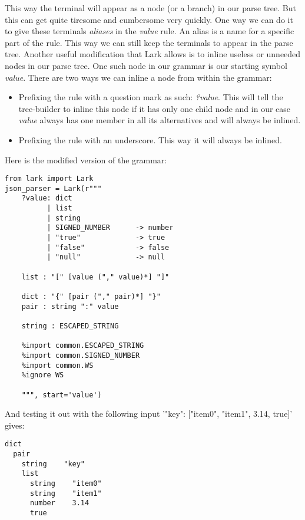 \documentclass[12pt]{article}
\begin{document}
This way the terminal will appear as a node (or a branch)  in our parse tree. But this can get quite tiresome and cumbersome very quickly. One way we can do it to give these terminals \emph{aliases} in the \emph{value} rule. An alias is a name for a specific part of the rule. This way we can still keep the terminals to appear in the parse tree. 
Another useful modification that Lark allows is to inline useless or unneeded nodes in our parse tree. One such node in our grammar is our starting symbol \emph{value}. There are two ways we can inline a node from within the grammar:
\begin{itemize}
    \item Prefixing the rule with a question mark as such: \emph{?value}. This will tell the tree-builder to inline this node if it has only one child node and in our case \emph{value} always has one member in all its alternatives and will always be inlined.
    
    \item Prefixing the rule with an underscore. This way it will always be inlined.

\end{itemize}

Here is the modified version of the grammar:

\begin{lstlisting}
from lark import Lark
json_parser = Lark(r"""
    ?value: dict
          | list
          | string
          | SIGNED_NUMBER      -> number
          | "true"             -> true
          | "false"            -> false
          | "null"             -> null

    list : "[" [value ("," value)*] "]"

    dict : "{" [pair ("," pair)*] "}"
    pair : string ":" value

    string : ESCAPED_STRING

    %import common.ESCAPED_STRING
    %import common.SIGNED_NUMBER
    %import common.WS
    %ignore WS

    """, start='value')

\end{lstlisting}

And testing it out with the following input '{"key": ["item0", "item1", 3.14, true]}' gives:

\begin{lstlisting}
dict
  pair
    string    "key"
    list
      string    "item0"
      string    "item1"
      number    3.14
      true
\end{lstlisting}
\end{document}
